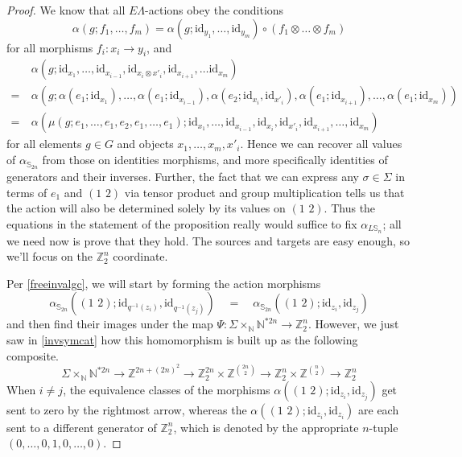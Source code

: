 \documentclass{amsbook} %
\newcommand{\id}{\textrm{id}}
\newcommand{\trans}[2]{( #1 \, \, #2 )}
\numberwithin{section}{chapter}
\begin{document}
\begin{proof}
We know that all $E\Lambda$-actions obey the conditions
  \[
    \alpha(g; f_1, \ldots, f_m) = \alpha(g; \id_{y_1}, \ldots, \id_{y_m}) \circ (f_1 \otimes \ldots \otimes f_m)
  \]
for all morphisms $f_i \colon  x_i \rightarrow y_i$, and
\begin{align*}
	&\alpha(  g ;  \id_{x_1}, \ldots, \id_{x_{i-1}}, \id_{x_i \otimes x'_{i}}, \id_{x_{i+1}}, \ldots \id_{x_m} ) \\
	=~&\alpha\left(  g  ;  \alpha(e_1;\id_{x_1}), \ldots, \alpha(e_1;\id_{x_{i-1}}), \alpha(e_2;\id_{x_i}, \id_{x'_i}), \alpha(e_1;\id_{x_{i+1}}), \ldots,  \alpha(e_1;\id_{x_m})  \right) \\
	=~&\alpha\left(  \mu(g; e_1, \ldots, e_1, e_2, e_1, \ldots, e_1)  ;  \id_{x_1}, \ldots, \id_{x_{i-1}}, \id_{x_i}, \id_{x'_{i}}, \id_{x_{i+1}}, \ldots, \id_{x_m}  \right)
\end{align*}
for all elements $g \in G$ and objects $x_1, \ldots, x_m, x'_i$. Hence we can recover all values of $\alpha_{\mathbb{S}_{2n}}$ from those on identities morphisms, and more specifically identities of generators and their inverses. Further, the fact that we can express any $\sigma \in \Sigma$ in terms of $e_1$ and $\trans{1}{2}$ via tensor product and group multiplication tells us that the action will also be determined solely by its values on $\trans{1}{2}$. Thus the equations in the statement of the proposition really would suffice to fix $\alpha_{L\mathbb{S}_n}$; all we need now is prove that they hold. The sources and targets are easy enough, so we'll focus on the $\mathbb{Z}_2^{n}$ coordinate.

Per \cref{freeinvalgc}, we will start by forming the action morphisms
  \[
    \alpha_{\mathbb{S}_{2n}}\left(  \trans{1}{2}  ;  \id_{q^{-1}(z_i)}, \id_{q^{-1}(z_j)}  \right) \quad = \quad \alpha_{\mathbb{S}_{2n}}\left( \trans{1}{2}  ; \id_{z_i}, \id_{z_j} \right)
  \]
and then find their images under the map $\Psi \colon  \Sigma \times_{\mathbb{N}} \mathbb{N}^{\ast 2n} \rightarrow \mathbb{Z}_2^{n}$. However, we just saw in \cref{invsymcat} how this homomorphism is built up as the following composite.
  \[
    \Sigma \times_{\mathbb{N}} \mathbb{N}^{\ast 2n} \rightarrow \mathbb{Z}^{2n+(2n)^2} \rightarrow \mathbb{Z}_2^{2n} \times \mathbb{Z}^{\binom{2n}{2}} \rightarrow \mathbb{Z}_2^n \times \mathbb{Z}^{\binom{n}{2}} \rightarrow \mathbb{Z}_2^n
  \]
When $i \neq j$, the equivalence classes of the morphisms $\alpha(\trans{1}{2};\id_{z_i}, \id_{z_j})$ get sent to zero by the rightmost arrow, whereas the $\alpha(\trans{1}{2};\id_{z_i}, \id_{z_i})$ are each sent to a different generator of $\mathbb{Z}_2^{n}$, which is denoted by the appropriate $n$-tuple $(0,\ldots,0, 1, 0,\ldots,0)$. 


\end{proof}
\end{document}
